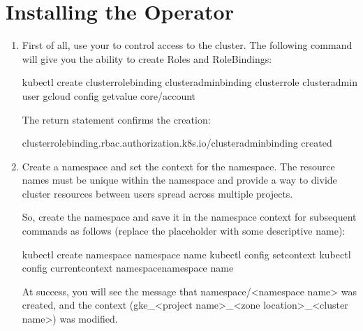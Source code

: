 \documentclass[letterpaper,10pt,english]{sphinxmanual}
\begin{document}
\section{Installing the Operator}
\label{\detokenize{gke:installing-the-operator}}\begin{enumerate}
%
\item {} 
First of all, use your  to control access to the cluster. The following command will give you the ability to create Roles and RoleBindings:

\begin{sphinxVerbatim}[commandchars=\\\{\}]
\PYGZdl{} kubectl create clusterrolebinding cluster\PYGZhy{}admin\PYGZhy{}binding \PYGZhy{}\PYGZhy{}clusterrole cluster\PYGZhy{}admin \PYGZhy{}\PYGZhy{}user gcloud config get\PYGZhy{}value core/account
\end{sphinxVerbatim}

The return statement confirms the creation:

\begin{sphinxVerbatim}[commandchars=\\\{\}]
clusterrolebinding.rbac.authorization.k8s.io/cluster\PYGZhy{}admin\PYGZhy{}binding created
\end{sphinxVerbatim}

\item {} 
Create a namespace and set the context for the namespace. The resource names must be unique within the namespace and provide a way to divide cluster resources between users spread across multiple projects.

So, create the namespace and save it in the namespace context for subsequent commands as follows (replace the  placeholder with some descriptive name):

\begin{sphinxVerbatim}[commandchars=\\\{\}]
\PYGZdl{} kubectl create namespace \PYGZlt{}namespace name\PYGZgt{}
\PYGZdl{} kubectl config set\PYGZhy{}context kubectl config current\PYGZhy{}context \PYGZhy{}\PYGZhy{}namespace\PYGZlt{}namespace name\PYGZgt{}
\end{sphinxVerbatim}

At success, you will see the message that namespace/\textless{}namespace name\textgreater{} was created, and the context (gke\_\textless{}project name\textgreater{}\_\textless{}zone location\textgreater{}\_\textless{}cluster name\textgreater{}) was modified.


\end{enumerate}
\end{document}
